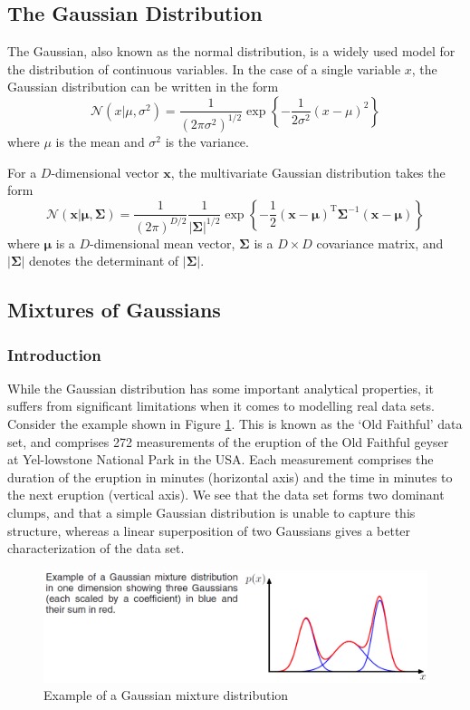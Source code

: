 ﻿\documentclass[a4paper, 11pt]{article}
\numberwithin{equation}{subsection}
\begin{document}
\subsection{The Gaussian Distribution}
The Gaussian, also known as the normal distribution, is a widely used model for the distribution of continuous variables. In the case of a single variable $x$, the Gaussian distribution can be written in the form
\begin{equation}
\mathcal N(x|\mu,\sigma^2)=\frac{1}{(2\pi\sigma^2)^{1/2}}\exp\left\{-\frac{1}{2\sigma^2}(x-\mu)^2\right\}
\end{equation}
where $\mu$ is the mean and $\sigma^2$ is the variance.

For a $D$-dimensional vector $\mathbf x$, the multivariate Gaussian distribution takes the form
\begin{equation}
\mathcal N(\mathbf x|\boldsymbol\mu,\boldsymbol\Sigma)=\frac{1}{(2\pi)^{D/2}}\frac{1}{|\boldsymbol\Sigma|^{1/2}}\exp\left\{-\frac{1}{2}(\mathbf x-\boldsymbol\mu)^{\mathrm T}\boldsymbol\Sigma^{-1}(\mathbf x-\boldsymbol\mu)\right\}
\end{equation}
where $\boldsymbol\mu$ is a $D$-dimensional mean vector, $\boldsymbol\Sigma$ is a $D\times D$ covariance matrix, and $|\boldsymbol\Sigma|$ denotes the determinant of $|\boldsymbol\Sigma|$.
\subsection{Mixtures of Gaussians}
\subsubsection{Introduction}
While the Gaussian distribution has some important analytical properties, it suffers from significant limitations when it comes to modelling real data sets. Consider the example shown in Figure \ref{fig:fig1}. This is known as the ‘Old Faithful’ data set, and comprises 272 measurements of the eruption of the Old Faithful geyser at Yel-lowstone National Park in the USA. Each measurement comprises the duration of the eruption in minutes (horizontal axis) and the time in minutes to the next eruption (vertical axis). We see that the data set forms two dominant clumps, and that a simple Gaussian distribution is unable to capture this structure, whereas a linear superposition of two Gaussians gives a better characterization of the data set.
\begin{figure}[ht]
\centering
\includegraphics[width=17cm]{fig/fig1.png}
\caption{Example of a Gaussian mixture distribution}
\label{fig:fig1}
\end{figure}
\end{document}
